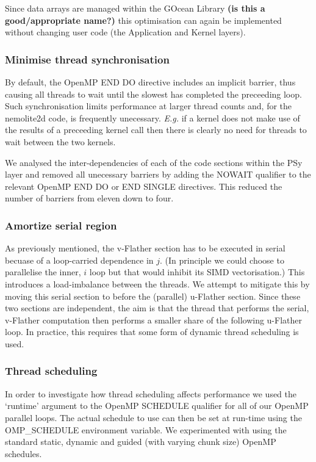 \documentclass[journal]{IEEEtran}
\begin{document}
Since data arrays are managed within the GOcean Library {\bf (is this
  a good/appropriate name?)} this optimisation can again be
implemented without changing user code (the Application and Kernel
layers).

\subsubsection{Minimise thread synchronisation}
\label{sec_synch}

By default, the OpenMP END DO directive includes an implicit barrier,
thus causing all threads to wait until the slowest has completed the
preceeding loop. Such synchronisation limits performance at larger
thread counts and, for the nemolite2d code, is frequently unecessary.
{\it E.g.} if a kernel does not make use of the results of a
preceeding kernel call then there is clearly no need for threads to
wait between the two kernels.

We analysed the inter-dependencies of each of the code sections within
the PSy layer and removed all unecessary barriers by adding the NOWAIT
qualifier to the relevant OpenMP END DO or END SINGLE directives. This
reduced the number of barriers from eleven down to four.

\subsubsection{Amortize serial region}
\label{sec_amortize}

As previously mentioned, the v-Flather section has to be executed in
serial becuase of a loop-carried dependence in $j$. (In principle we
could choose to parallelise the inner, $i$ loop but that would inhibit
its SIMD vectorisation.) This introduces a load-imbalance between the
threads. We attempt to mitigate this by moving this serial section to
before the (parallel) u-Flather section. Since these two sections are
independent, the aim is that the thread that performs the serial,
v-Flather computation then performs a smaller share of the following
u-Flather loop. In practice, this requires that some form of dynamic
thread scheduling is used.

\subsubsection{Thread scheduling}
\label{sec_scheduling}

In order to investigate how thread scheduling affects performance we
used the `runtime' argument to the OpenMP SCHEDULE qualifier for all
of our OpenMP parallel loops. The actual schedule to use can then be
set at run-time using the OMP\_SCHEDULE environment variable. We
experimented with using the standard static, dynamic and guided (with varying
chunk size) OpenMP schedules.
\end{document}
